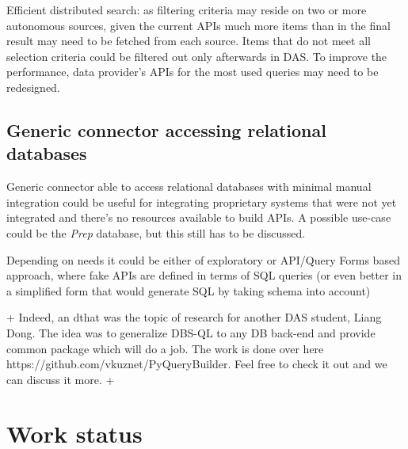 \documentclass[a4paper,11pt,draft]{article}
\begin{document}
\begin{compactitem}
					
					\item Efficient distributed search: as filtering criteria may reside on two or more autonomous sources, given the current APIs much more items than in the final result may need to be fetched from each source. Items that do not meet all selection criteria could be filtered out only afterwards in DAS. To improve the performance, data provider's APIs for the most used queries may need to be redesigned.
\end{compactitem}


\subsection{Generic connector accessing relational databases}
{\color{red}Generic connector able to access relational databases with minimal manual integration could be useful for integrating proprietary systems that were not yet integrated and there's no resources available to build APIs. A possible use-case could be the \textit{Prep} database, but this still has to be discussed. 

Depending on needs it could be either of exploratory or API/Query Forms based approach, where fake APIs are defined in terms of SQL queries (or even better in a simplified form that would generate SQL by taking schema into account)}
+{\color{green} Indeed, an dthat was the topic of research for another DAS student, Liang Dong. The idea was to generalize DBS-QL to any DB back-end and provide common package which will do a job. The work is done over here https://github.com/vkuznet/PyQueryBuilder. Feel free to check it out and we can discuss it more.}
+









\section{Work status}
\end{document}
